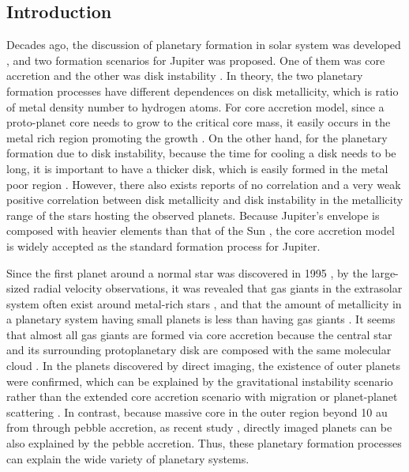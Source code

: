\documentclass[twocolumn, dvipdfmx]{aastex62}
\begin{document}
\begin{CJK*}{UTF8}{min}
\section{Introduction} \label{sec:introduction}

Decades ago, the discussion of planetary formation in solar system was developed \citep{1985Arizona}, and two formation scenarios for Jupiter was proposed. One of them was core accretion \citep{1974Icar...22..416P, 1980PThPh..64..544M, 1996Icar..124...62P} and the other was disk instability \citep{1951PNAS...37....1K, 1997Sci...276.1836B, 2002Sci...298.1756M}. In theory, the two planetary formation processes have different dependences on disk metallicity, which is ratio of metal density number to hydrogen atoms. For core accretion model, since a proto-planet core needs to grow to the critical core mass, it easily occurs in the metal rich region promoting the growth \citep{2004ApJ...616..567I, 2012A&A...541A..97M}. On the other hand, for the planetary formation due to disk instability, because the time for cooling a disk needs to be long, it is important to have a thicker disk, which is easily formed in the metal poor region \citep{2006ApJ...636L.149C, 2007Arizona}. However, there also exists reports of no correlation \citep{2002ApJ...567L.149B} and a very weak positive correlation \citep{2007ApJ...661L..77M} between disk metallicity and disk instability in the metallicity range of the stars hosting the observed planets. Because Jupiter's envelope is composed with heavier elements than that of the Sun \citep{2003NewAR..47....1Y}, the core accretion model is widely accepted as the standard formation process for Jupiter.

Since the first planet around a normal star was discovered in 1995
\citep{1995Natur.378..355M}, by the large-sized radial velocity observations, it was revealed that gas giants in the extrasolar system often exist around metal-rich stars \citep{2003A&A...398..363S, 2005ApJ...622.1102F}, and that the amount of metallicity in a planetary system having small planets is less than having gas giants \citep{2011arXiv1109.2497M, 2015AJ....149...14W}. It seems that almost all gas giants are formed via core accretion because the central star and its surrounding protoplanetary disk are composed with the same molecular cloud \citep{2004ApJ...616..567I, 2012A&A...541A..97M}. In the planets discovered by direct imaging, the existence of outer planets were confirmed, which can be explained by the gravitational instability  scenario rather than the extended core accretion scenario with migration or planet-planet scattering \citep{2009ApJ...707...79D}. In contrast, because massive core in the outer region beyond 10 au from through pebble accretion, as recent study \citep{2010A&A...520A..43O, 2012A&A...544A..32L}, directly imaged planets can be also explained by the pebble accretion. Thus, these planetary formation processes can explain the wide variety of planetary systems.


\end{CJK*}
\end{document}
